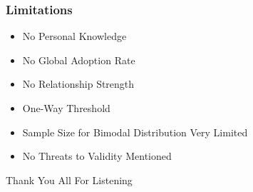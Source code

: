 \documentclass[slidestop,usenames,dvipsnames]{beamer}
\newcommand{\fitem}{\pause\vfill\item}
\begin{document}
\begin{frame}
    \frametitle{Limitations}
    \begin{itemize}
        \fitem No Personal Knowledge
        \fitem No Global Adoption Rate
        \fitem No Relationship Strength
        \fitem One-Way Threshold
        \fitem Sample Size for Bimodal Distribution Very Limited
        \fitem No Threats to Validity Mentioned
    \end{itemize}
    \vfill
\end{frame}




\begin{frame}
    \vfill
    \begin{center}
        {\Huge Thank You All For Listening}\
    \end{center}
\end{frame}
\end{document}
